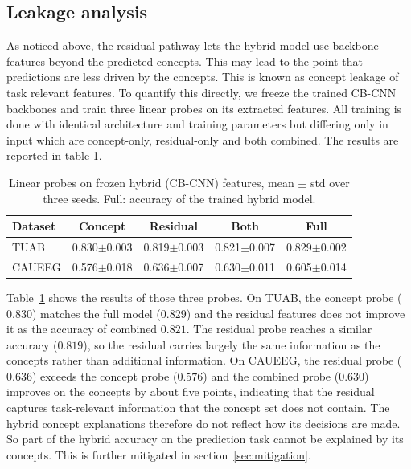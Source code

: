 \documentclass[journal,twoside,web]{ieeecolor}
\begin{document}
\subsection{Leakage analysis}
\label{sec:leakage}

As noticed above, the residual pathway lets the hybrid model use backbone features beyond the predicted concepts. This may lead to the point that predictions are less driven by the concepts. This is known as concept leakage of task relevant features. To quantify this directly, we freeze the trained CB-CNN backbones and train three linear probes on its extracted features. All training is done with identical architecture and training parameters but differing only in input which are concept-only, residual-only and both combined. The results are reported in table \ref{tab:leakage}. 


\begin{table}[h]
\caption{Linear probes on frozen hybrid (CB-CNN) features, mean $\pm$ std over three seeds. Full: accuracy of the trained hybrid model.}
\centering
\footnotesize
\setlength{\tabcolsep}{3pt}
\begin{tabular}{@{}l ccc c@{}}
\hline
Dataset & Concept & Residual & Both & Full \\
\hline
TUAB   & 0.830$\pm$0.003 & 0.819$\pm$0.003 & 0.821$\pm$0.007 & 0.829$\pm$0.002 \\
CAUEEG & 0.576$\pm$0.018 & 0.636$\pm$0.007 & 0.630$\pm$0.011 & 0.605$\pm$0.014 \\
\hline
\end{tabular}
\label{tab:leakage}
\end{table}


Table~\ref{tab:leakage} shows the results of those three probes. On TUAB, the concept probe ($0.830$) matches the full model ($0.829$) and the residual features does not improve it as the accuracy of combined $0.821$. The residual probe reaches a similar accuracy ($0.819$), so the residual carries largely the same information as the concepts rather than additional information. On CAUEEG, the residual probe ($0.636$) exceeds the concept probe ($0.576$) and the combined probe ($0.630$) improves on the concepts by about five points, indicating that the residual captures task-relevant information that the concept set does not contain. The hybrid concept explanations therefore do not reflect how its decisions are made. So part of the hybrid accuracy on the prediction task cannot be explained by its concepts. This is further mitigated in section~\ref{sec:mitigation}.
\end{document}
